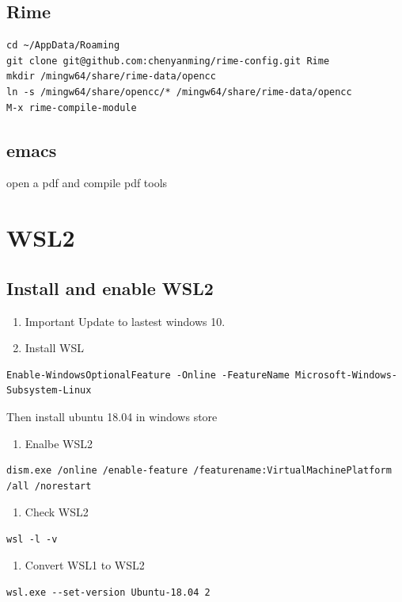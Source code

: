 \documentclass[11pt]{article}
\begin{document}
\subsection{Rime}
\label{sec:org581c784}
\begin{verbatim}
cd ~/AppData/Roaming
git clone git@github.com:chenyanming/rime-config.git Rime
mkdir /mingw64/share/rime-data/opencc
ln -s /mingw64/share/opencc/* /mingw64/share/rime-data/opencc
M-x rime-compile-module
\end{verbatim}

\subsection{emacs}
\label{sec:org258cef3}
open a pdf and compile pdf tools

\section{WSL2}
\label{sec:orgc61d656}
\subsection{Install and enable WSL2}
\label{sec:org5858ce6}
\begin{enumerate}
\item Important Update to lastest windows 10.

\item Install WSL
\end{enumerate}
\begin{verbatim}
Enable-WindowsOptionalFeature -Online -FeatureName Microsoft-Windows-Subsystem-Linux
\end{verbatim}
Then install ubuntu 18.04 in windows store

\begin{enumerate}
\item Enalbe WSL2
\end{enumerate}
\begin{verbatim}
dism.exe /online /enable-feature /featurename:VirtualMachinePlatform /all /norestart
\end{verbatim}

\begin{enumerate}
\item Check WSL2
\end{enumerate}
\begin{verbatim}
wsl -l -v
\end{verbatim}

\begin{enumerate}
\item Convert WSL1 to WSL2
\end{enumerate}
\begin{verbatim}
wsl.exe --set-version Ubuntu-18.04 2
\end{verbatim}
\end{document}
